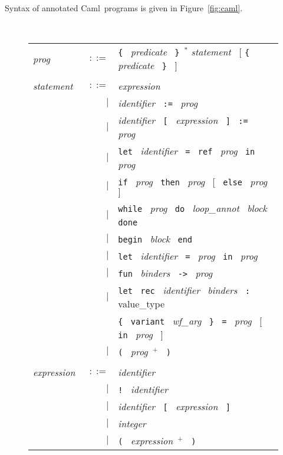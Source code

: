 \documentclass[a4paper,12pt]{report}
\newcommand{\caml}{\textsf{Caml}}
\newcommand{\te}[1]{\texttt{#1}~}
\newcommand{\nt}[1]{\textsl{#1}~}
\begin{document}
Syntax of annotated \caml\ programs is given in Figure~\ref{fig:caml}.
\begin{figure}[htbp]
\begin{center}
\hrulefill\\
\begin{tabular}{lrl}
  \nt{prog} 
    & $::=$ & \te{\{} \nt{predicate} \te{\}}$^*$
              \nt{statement} 
              $[$ \te{\{} \nt{predicate} \te{\}} $]$ \\

       & & \\[0.1em]

  \nt{statement}
    & $::=$ & \nt{expression} \\
      & $|$ & \nt{identifier}  \te{:=}  \nt{prog} \\
      & $|$ & \nt{identifier}  \te{[}  \nt{expression}  \te{]}
              \te{:=}  \nt{prog} \\
      & $|$ & \te{let}  \nt{identifier}  \te{=}  \te{ref} 
              \nt{prog}  \te{in}  \nt{prog} \\
      & $|$ & \te{if}  \nt{prog}  \te{then}  \nt{prog}
              $[$~ \te{else}  \nt{prog} $]$ \\
      & $|$ & \te{while}  \nt{prog}  \te{do}
              \nt{loop\_annot}  \nt{block}  \te{done} \\
      & $|$ & \te{begin}  \nt{block}  \te{end} \\
      & $|$ & \te{let}  \nt{identifier}  \te{=}  \nt{prog} 
              \te{in}  \nt{prog} \\
      & $|$ & \te{fun}  \nt{binders}  \te{->}  \nt{prog} \\
      & $|$ & \te{let}  \te{rec}  \nt{identifier}  \nt{binders}  \te{:}
              value\_type \\
      &     & \te{\{}  \te{variant}  \nt{wf\_arg}  \te{\}}
              \te{=}  \nt{prog}  $[$~ \te{in}  \nt{prog} $]$ \\
      & $|$ & \te{(}  \nt{prog}$^+$~  \te{)} \\

      & & \\[0.1em]

  \nt{expression}
    & $::=$ & \nt{identifier} \\
      & $|$ & \te{!}  \nt{identifier} \\
      & $|$ & \nt{identifier}  \te{[}  \nt{expression}  \te{]} \\
      & $|$ & \nt{integer} \\
      & $|$ & \te{(}  \nt{expression}$^+$~  \te{)} \\


\end{tabular}
\end{center}
\end{figure}
\end{document}
